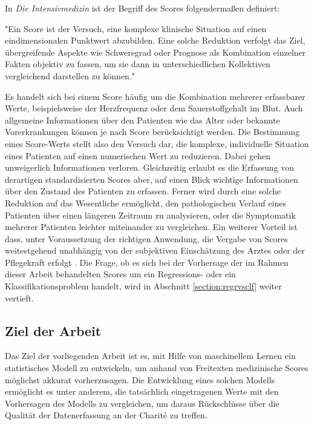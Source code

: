 In \textit{Die Intensivmedizin} \citep{marxIntensivmedizin2015c} ist der Begriff des Scores folgendermaßen definiert:

\begin{itquote}
    "Ein Score ist der Versuch, eine komplexe klinische Situation auf einen eindimensionalen Punktwert abzubilden. Eine solche Reduktion verfolgt das Ziel, übergreifende Aspekte wie Schweregrad oder Prognose als Kombination einzelner Fakten objektiv zu fassen, um sie dann in unterschiedlichen Kollektiven vergleichend darstellen zu können."
\end{itquote}

Es handelt sich bei einem Score häufig um die Kombination mehrerer erfassbarer Werte, beispielsweise der Herzfrequenz oder dem Sauerstoffgehalt im Blut. Auch allgemeine Informationen über den Patienten wie das Alter oder bekannte Vorerkrankungen können je nach Score berücksichtigt werden. Die Bestimmung eines Score-Werts stellt also den Versuch dar, die komplexe, individuelle Situation eines Patienten auf einen numerischen Wert zu reduzieren. Dabei gehen unweigerlich Informationen verloren. Gleichzeitig erlaubt es die Erfassung von derartigen standardisierten Scores aber, auf einen Blick wichtige Informationen über den Zustand des Patienten zu erfassen. Ferner wird durch eine solche Reduktion auf das Wesentliche ermöglicht, den pathologischen Verlauf eines Patienten über einen längeren Zeitraum zu analysieren, oder die Symptomatik mehrerer Patienten leichter miteinander zu vergleichen. Ein weiterer Vorteil ist dass, unter Voraussetzung der richtigen Anwendung, die Vergabe von Scores weitestgehend unabhängig von der subjektiven Einschätzung des Arztes oder der Pflegekraft erfolgt \citep{marxIntensivmedizin2015c}.
Die Frage, ob es sich bei der Vorhersage der im Rahmen dieser Arbeit behandelten Scores um ein Regressions- oder ein Klassifikationsproblem handelt, wird in Abschnitt \ref{section:regrvsclf} weiter vertieft. 

\subsection{Ziel der Arbeit}
Das Ziel der vorliegenden Arbeit ist es, mit Hilfe von maschinellem Lernen ein statistisches Modell zu entwickeln, um anhand von Freitexten medizinische Scores möglichst akkurat vorherzusagen. Die Entwicklung eines solchen Modells ermöglicht es unter anderem, die tatsächlich eingetragenen Werte mit den Vorhersagen des Modells zu vergleichen, um daraus Rückschlüsse über die Qualität der Datenerfassung an der Charité zu treffen.

